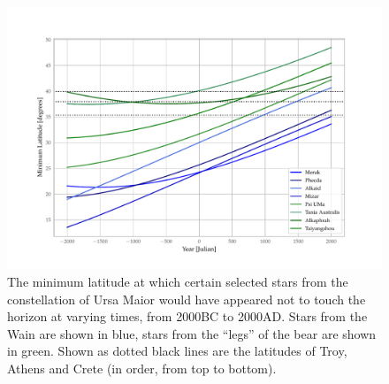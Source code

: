 \documentclass[main.tex]{subfiles}
\begin{document}
\begin{figure}[ht]
\centering
\includegraphics[width=\textwidth]{figures/Ursa.pdf}
\caption{The minimum latitude at which certain selected stars from the constellation of Ursa Maior would have appeared not to touch the horizon at varying times, from 2000BC to 2000AD. Stars from the Wain are shown in blue, stars from the ``legs'' of the bear are shown in green. Shown as dotted black lines are the latitudes of Troy, Athens and Crete (in order, from top to bottom).}
\label{fig:ursa}
\end{figure}
\end{document}
